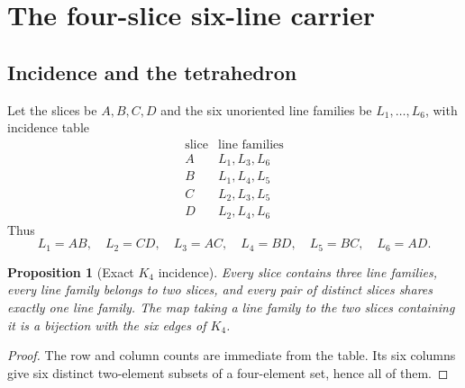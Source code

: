 \documentclass[11pt]{amsart}
\newtheorem{proposition}[theorem]{Proposition}
\theoremstyle{definition}
\theoremstyle{remark}
\begin{document}
\section{The four-slice six-line carrier}\label{sec:carrier}

\subsection{Incidence and the tetrahedron}

Let the slices be $A,B,C,D$ and the six unoriented line families be $L_1,\dots,L_6$, with incidence table
\[
\begin{array}{c|c}
\text{slice}&\text{line families}\\ \hline
A&L_1,L_3,L_6\\
B&L_1,L_4,L_5\\
C&L_2,L_3,L_5\\
D&L_2,L_4,L_6
\end{array}
\]
Thus
\[
 L_1=AB,\quad L_2=CD,\quad L_3=AC,\quad
 L_4=BD,\quad L_5=BC,\quad L_6=AD.
\]

\begin{proposition}[Exact $K_4$ incidence]\label{prop:k4}
Every slice contains three line families, every line family belongs to two slices, and every pair of distinct slices shares exactly one line family. The map taking a line family to the two slices containing it is a bijection with the six edges of $K_4$.
\end{proposition}

\begin{proof}
The row and column counts are immediate from the table. Its six columns give six distinct two-element subsets of a four-element set, hence all of them.
\end{proof}

\begin{center}
\end{center}
\end{document}
